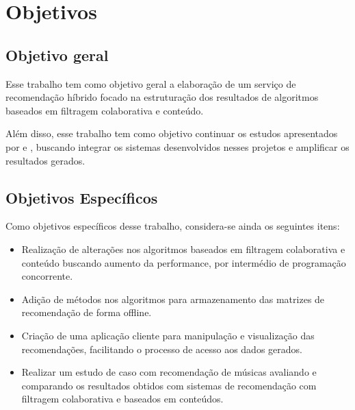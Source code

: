 
\chapter{\textbf{Objetivos}} %

\section{Objetivo geral}

Esse trabalho tem como objetivo geral a elaboração de um serviço de recomendação híbrido focado na estruturação dos resultados de algoritmos baseados em filtragem colaborativa e conteúdo.

Além disso, esse trabalho tem como objetivo continuar os estudos apresentados por  e , buscando integrar os sistemas desenvolvidos nesses projetos e amplificar os resultados gerados.

\section{Objetivos Específicos}

Como objetivos específicos desse trabalho, considera-se ainda os seguintes itens:
\begin{itemize}
    \item Realização de alterações nos algoritmos baseados em filtragem colaborativa e conteúdo buscando aumento da performance, por intermédio de programação concorrente.
    \item Adição de métodos nos algoritmos para armazenamento das matrizes de recomendação de forma offline.
    \item Criação de uma aplicação cliente para manipulação e visualização das recomendações, facilitando o processo de acesso aos dados gerados.
    \item Realizar um estudo de caso com recomendação de músicas avaliando e comparando os resultados obtidos com sistemas de recomendação com filtragem colaborativa e baseados em conteúdos.
\end{itemize}{}